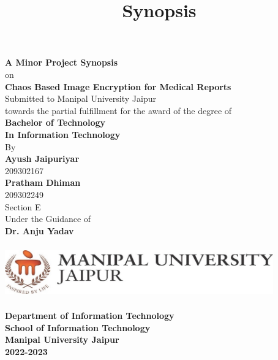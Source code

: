 \documentclass[12pt,a4paper,english]{article}
\begin{document}
\title{Synopsis}
\begin{titlepage}
    \begin{center}
        \LARGE
        \textbf{A Minor Project Synopsis}\\
        on\\
        \Huge
        \textbf{Chaos Based Image Encryption for Medical Reports}\\
        \vspace{0.5cm}
        \Large
        Submitted to Manipal University Jaipur\\
        towards the partial fulfillment for the award of the degree of\\
        \vspace{0.5cm}
        \LARGE
        \textbf{Bachelor of Technology}\\
        \textbf{In Information Technology}\\
        \vspace{0.5cm}
        \large
        By\\
        \Large
        \textbf{Ayush Jaipuriyar}\\
        209302167\\
        \textbf{Pratham Dhiman}\\
        209302249\\
        Section E\\
        \vspace{0.5cm}
        \large
        Under the Guidance of\\
        \Large
        \textbf{Dr. Anju Yadav }

        \vfill

        \includegraphics[width=11.58cm,height=2.28cm]{./logo}

        \LARGE
        \textbf{Department of Information Technology}\\
        \textbf{School of Information Technology }\\
        \textbf{Manipal University Jaipur}\\
        \Large
        \textbf{2022-2023}

    \end{center}
\end{titlepage}
\newpage
\date{}
\title{}
\maketitle
\tableofcontents
\newpage
\end{document}
